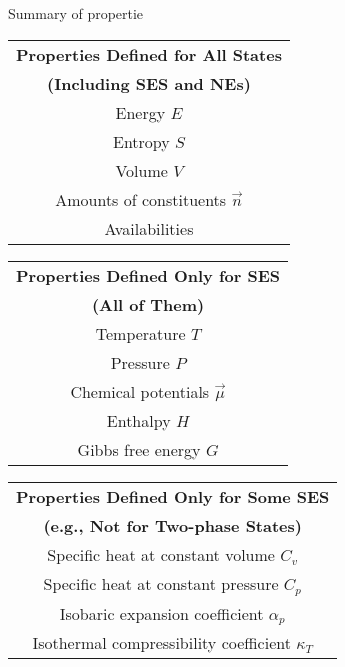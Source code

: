 \begin{add}
    Summary of propertie
    \begin{center} 
        \begin{minipage}{0.45\textwidth}
        \centering
        \begin{tabular}{|c|}
        \hline
        \textbf{Properties Defined for All States} \\
        \textbf{(Including SES and NEs)} \\ \hline
        Energy \(E\) \\ \hline
        Entropy \(S\) \\ \hline
        Volume \(V\) \\ \hline
        Amounts of constituents \(\vec{n}\) \\ \hline
        Availabilities \\ \hline
        \end{tabular}
        \end{minipage}
        \hfil
        \begin{minipage}{0.45\textwidth}
        \centering
        \begin{tabular}{|c|}
        \hline
        \textbf{Properties Defined Only for SES} \\
        \textbf{(All of Them)} \\ \hline
        Temperature \(T\) \\ \hline
        Pressure \(P\) \\ \hline
        Chemical potentials \(\vec{\mu}\) \\ \hline
        Enthalpy \(H\) \\ \hline
        Gibbs free energy \(G\) \\ \hline
        \end{tabular}
        \end{minipage}
        
        \begin{minipage}{0.7\textwidth}
        \centering
        \begin{tabular}{|c|}
        \hline
        \textbf{Properties Defined Only for Some SES} \\
        \textbf{(e.g., Not for Two-phase States)} \\ \hline
        Specific heat at constant volume \(C_v\) \\ \hline
        Specific heat at constant pressure \(C_p\) \\ \hline
        Isobaric expansion coefficient \(\alpha_p\) \\ \hline
        Isothermal compressibility coefficient \(\kappa_T\) \\ \hline
        \end{tabular}
        \end{minipage}
\end{center}
\end{add}
